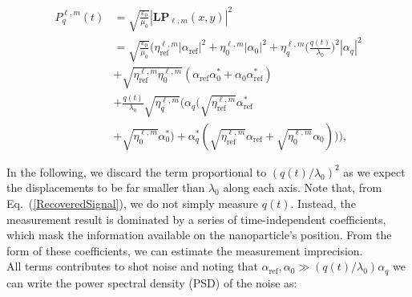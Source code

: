 \documentclass[%
 reprint,
 amsmath,amssymb,
 aps,
pra,
]{revtex4-2}
\begin{document}
\begin{equation}
\begin{split}
    P^{\ell,m}_{q}(t) &= \sqrt{\frac{\varepsilon_{0}}{\mu_{0}}}\left|\textbf{LP}_{\ell,m}(x, y)\right|^{2} \\
    & = \sqrt{\frac{\varepsilon_{0}}{\mu_{0}}} \Bigg(\eta^{\ell,m}_{\mathrm{ref}}|\alpha_{\mathrm{ref}}|^{2} + \eta^{\ell,m}_{0}|\alpha_{0}|^{2} + \eta^{\ell,m}_{q}\Big(\frac{q(t)}{\lambda_{0}}\Big)^2|\alpha_{q}|^{2} \\
    & +  \sqrt{\eta^{\ell,m}_{\mathrm{ref}}\eta^{\ell,m}_{0}}(\alpha_{\mathrm{ref}}\alpha_{0}^*+\alpha_{0}\alpha_{\mathrm{ref}}^*) \\
    & + \frac{q(t)}{\lambda_{0}}\sqrt{\eta^{\ell,m}_{q}}\Big(\alpha_{q}(\sqrt{\eta^{\ell,m}_{\mathrm{ref}}}\alpha_{\mathrm{ref}}^* \\
    & + \sqrt{\eta^{\ell,m}_{0}}\alpha_{0}^*) + \alpha_{q}^*(\sqrt{\eta^{\ell,m}_{\mathrm{ref}}}\alpha_{\mathrm{ref}} + \sqrt{\eta^{\ell,m}_{0}}\alpha_{0})\Big)\Bigg),\label{RecoveredSignal}
\end{split}
\end{equation}

In the following, we discard the term proportional to $(q(t)/\lambda_0)^{2}$ as we expect the displacements to be far smaller than $\lambda_0$ along each axis. Note that, from Eq.~(\ref{RecoveredSignal}), we do not simply measure $q(t)$. Instead, the measurement result is dominated by a series of time-independent coefficients, which mask the information available on the nanoparticle's position. From the form of these coefficients, we can estimate the measurement imprecision.\\
All terms contributes to shot noise and noting that $\alpha_{\mathrm{ref}},\alpha_{0}\gg(q(t)/\lambda_0)\alpha_{q}$ we can write the power spectral density (PSD) of the noise as:
\end{document}
